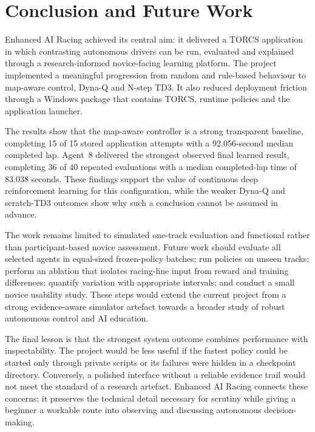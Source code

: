 \section{Conclusion and Future Work}
\label{ch:conclusion}

Enhanced AI Racing achieved its central aim: it delivered a TORCS application in which contrasting autonomous drivers can be run, evaluated and explained through a research-informed novice-facing learning platform. The project implemented a meaningful progression from random and rule-based behaviour to map-aware control, Dyna-Q and N-step TD3. It also reduced deployment friction through a Windows package that contains TORCS, runtime policies and the application launcher.

The results show that the map-aware controller is a strong transparent baseline, completing 15 of 15 stored application attempts with a 92.056-second median completed lap. Agent~8 delivered the strongest observed final learned result, completing 36 of 40 repeated evaluations with a median completed-lap time of 83.038 seconds. These findings support the value of continuous deep reinforcement learning for this configuration, while the weaker Dyna-Q and scratch-TD3 outcomes show why such a conclusion cannot be assumed in advance.

The work remains limited to simulated one-track evaluation and functional rather than participant-based novice assessment. Future work should evaluate all selected agents in equal-sized frozen-policy batches; run policies on unseen tracks; perform an ablation that isolates racing-line input from reward and training differences; quantify variation with appropriate intervals; and conduct a small novice usability study. These steps would extend the current project from a strong evidence-aware simulator artefact towards a broader study of robust autonomous control and AI education.

The final lesson is that the strongest system outcome combines performance with inspectability. The project would be less useful if the fastest policy could be started only through private scripts or its failures were hidden in a checkpoint directory. Conversely, a polished interface without a reliable evidence trail would not meet the standard of a research artefact. Enhanced AI Racing connects these concerns: it preserves the technical detail necessary for scrutiny while giving a beginner a workable route into observing and discussing autonomous decision-making.

